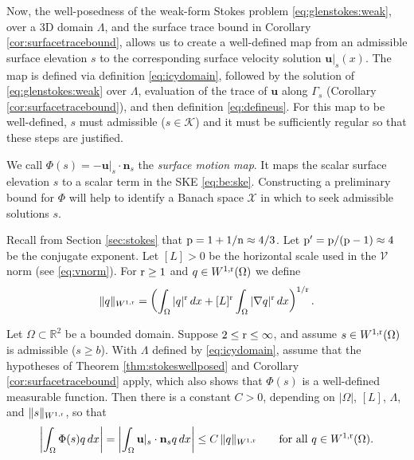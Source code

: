 \documentclass[hidelinks,onefignum,onetabnum,final]{siamart220329}  %
\newcommand{\RR}{\mathbb{R}}
\newcommand{\grad}{\nabla}
\newcommand{\bn}{\mathbf{n}}
\newcommand{\bu}{\mathbf{u}}
\newcommand{\cK}{\mathcal{K}}
\newcommand{\cV}{\mathcal{V}}
\newcommand{\cX}{\mathcal{X}}
\newcommand{\nn}{{\text{\textnormal{n}}}}
\newcommand{\pp}{{\text{\textnormal{p}}}}
\newcommand{\rr}{{\text{\textnormal{r}}}}
\begin{document}
Now, the well-posedness of the weak-form Stokes problem \eqref{eq:glenstokes:weak}, over a 3D domain $\Lambda$, and the surface trace bound in Corollary \ref{cor:surfacetracebound}, allows us to create a well-defined map from an admissible surface elevation $s$ to the corresponding surface velocity solution $\bu|_s(x)$.  The map is defined via definition \eqref{eq:icydomain}, followed by the solution of \eqref{eq:glenstokes:weak} over $\Lambda$, evaluation of the trace of $\bu$ along $\Gamma_s$ (Corollary \ref{cor:surfacetracebound}), and then definition \eqref{eq:defineus}.  For this map to be well-defined, $s$ must admissible ($s\in\cK$) and it must be sufficiently regular so that these steps are justified.

We call $\Phi(s) = - \bu|_s\cdot \bn_s$ the \emph{surface motion map}.  It maps the scalar surface elevation $s$ to a scalar term in the SKE \eqref{eq:be:ske}.  Constructing a preliminary bound for $\Phi$ will help to identify a Banach space $\cX$ in which to seek admissible solutions $s$.

Recall from Section \ref{sec:stokes} that $\pp=1+1/\nn \approx 4/3$.  Let $\pp'=\pp/(\pp-1) \approx 4$ be the conjugate exponent.  Let $[L]>0$ be the horizontal scale used in the $\cV$ norm (see \eqref{eq:vnorm}).  For $\rr\ge 1$ and $q\in W^{1,\rr}(\Omega)$ we define
\begin{equation}
\|q\|_{W^{1,\rr}} = \left(\int_\Omega |q|^\rr\,dx + [L]^\rr \int_\Omega |\grad q|^\rr\,dx\right)^{1/\rr}. \label{eq:norm:Omega}
\end{equation}

\begin{lemma} \label{lem:phibound:early}  Let $\Omega \subset \RR^2$ be a bounded domain.  Suppose $2 \le \rr \le \infty$, and assume $s\in W^{1,\rr}(\Omega)$ is admissible ($s\ge b$).  With $\Lambda$ defined by \eqref{eq:icydomain}, assume that the hypotheses of Theorem \ref{thm:stokeswellposed} and Corollary \ref{cor:surfacetracebound} apply, which also shows that $\Phi(s)$ is a well-defined measurable function.  Then there is a constant $C>0$, depending on $|\Omega|$, $[L]$, $\Lambda$, and $\|s\|_{W^{1,\rr}}$, so that
\begin{equation}
\left|\int_\Omega \Phi(s) q\,dx\right| = \left|\int_\Omega \bu|_s\cdot \bn_s q\,dx\right| \le C\, \|q\|_{W^{1,\rr}} \qquad \text{for all } q\in W^{1,\rr}(\Omega).  \label{eq:phibound:early}
\end{equation}
\end{lemma}
\end{document}
